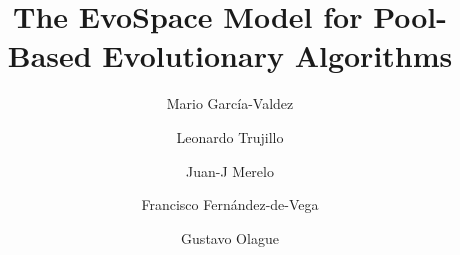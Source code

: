 %
%
%
%
%
%
\documentclass[smallcondensed]{svjour3} %
\smartqed  %
%


\usepackage{graphicx}
\usepackage{palatino,epsfig,latexsym}
\usepackage{amsmath,amsfonts,amssymb,color}
\usepackage{graphicx}
\usepackage{algorithm}
\usepackage{algorithmic}
\usepackage{subfigure}
\usepackage{multirow}
\usepackage{bbm}
\usepackage{url}
\usepackage{float}
\renewcommand{\textfraction}{.01}
\renewcommand{\bottomfraction}{.99}
\renewcommand{\topfraction}{.99}
\sloppy
%


\title{The EvoSpace Model for Pool-Based Evolutionary Algorithms}



\author{Mario Garc\'ia-Valdez         \and
        Leonardo Trujillo \and
		Juan-J Merelo\and
		Francisco Fern\'andez-de-Vega\and
		Gustavo Olague
		}


